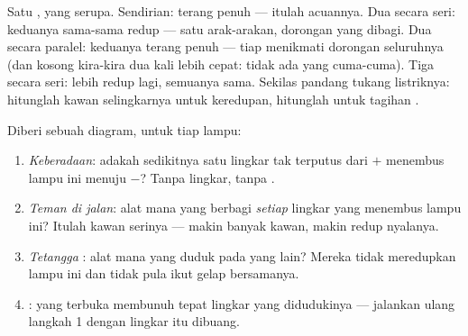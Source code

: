 \begin{example}\label{ex:g7:circuits-series-parallel:brightness}
Satu ,  yang serupa. Sendirian: terang penuh --- itulah
acuannya. Dua secara seri: keduanya sama-sama redup --- satu
arak-arakan, dorongan yang dibagi. Dua secara paralel: keduanya terang
penuh --- tiap  menikmati dorongan seluruhnya (dan 
kosong kira-kira dua kali lebih cepat: tidak ada yang cuma-cuma). Tiga
secara seri: lebih redup lagi, semuanya sama. Sekilas pandang tukang
listriknya: hitunglah kawan selingkarnya untuk keredupan, hitunglah
 untuk tagihan .
\end{example}

\begin{method}\label{met:g7:circuits-series-parallel:predict}
Diberi sebuah diagram, untuk tiap lampu:
\begin{enumerate}
  \item \emph{Keberadaan}: adakah sedikitnya satu lingkar tak terputus
        dari $+$ menembus lampu ini menuju $-$? Tanpa lingkar, tanpa
        .
  \item \emph{Teman di jalan}: alat mana yang berbagi \emph{setiap}
        lingkar yang menembus lampu ini? Itulah kawan serinya ---
        makin banyak kawan, makin redup nyalanya.
  \item \emph{Tetangga }: alat mana yang duduk pada  yang
        lain? Mereka tidak meredupkan lampu ini dan tidak pula ikut
        gelap bersamanya.
  \item \emph{}:  yang terbuka membunuh tepat lingkar
        yang didudukinya --- jalankan ulang langkah 1 dengan lingkar
        itu dibuang.
\end{enumerate}
\end{method}

